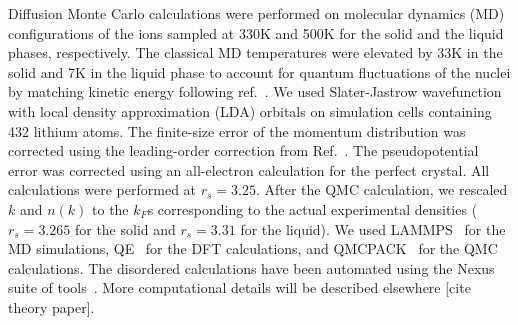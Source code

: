 \documentclass[twocolumn,showpacs,showkeys,fleqn,prl,superscriptaddress]{revtex4}%
\begin{document}
Diffusion Monte Carlo calculations were performed on molecular dynamics (MD) configurations of the ions sampled at 330K and 500K for the solid and the liquid phases, respectively. The classical MD temperatures were elevated by 33K in the solid and 7K in the liquid phase to account for quantum fluctuations of the nuclei by matching kinetic energy following ref.~\cite{filippi98}. We used Slater-Jastrow wavefunction with local density approximation (LDA) orbitals on simulation cells containing 432 lithium atoms. The finite-size error of the momentum distribution was corrected using the leading-order correction from Ref.~\cite{holz09}. The pseudopotential error was corrected using an all-electron calculation for the perfect crystal. All calculations were performed at $r_s=3.25$. After the QMC calculation, we rescaled $k$ and $n(k)$ to the $k_F$s corresponding to the actual experimental densities ($r_s=3.265$ for the solid and $r_s=3.31$ for the liquid). We used LAMMPS~\cite{Plimpton1993} for the MD simulations, QE~\cite{Giannozzi2009,Enkovaara2017} for the DFT calculations, and QMCPACK~\cite{Kim2018} for the QMC calculations. The disordered calculations have been automated using the Nexus suite of tools~\cite{Krogel2016}.
More computational details will be described elsewhere [cite theory paper].
\end{document}
